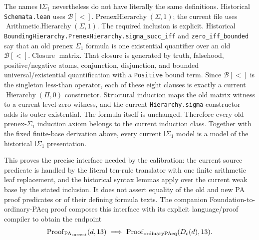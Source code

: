 The names $\mathsf I\Sigma _1$ nevertheless do not have literally
the same definitions.  Historical \texttt{Schemata.lean} uses
$\mathcal B[<].\operatorname{PrenexHierarchy}(\Sigma,1)$;
the current file uses
$\operatorname{Arithmetic.Hierarchy}(\Sigma,1)$.
The required inclusion is explicit.  Historical
\texttt{BoundingHierarchy.PrenexHierarchy.sigma\_succ\_iff}
and \texttt{zero\_iff\_bounded} say that an old prenex
$\Sigma_1$ formula is one existential quantifier over an old
$\mathcal B[<].\operatorname{Closure}$ matrix.  That closure is
generated by truth, falsehood, positive/negative atoms,
conjunction, disjunction, and bounded universal/existential
quantification with a \texttt{Positive} bound term.
Since $\mathcal B[<]$ is the singleton less-than operator, each of
these eight clauses is exactly a current
$\operatorname{Hierarchy}(\Pi,0)$ constructor.  Structural
induction maps the old matrix witness to a current level-zero
witness, and the current \texttt{Hierarchy.sigma} constructor
adds its outer existential.  The formula itself is unchanged.
Therefore every old prenex-$\Sigma_1$ induction axiom belongs to
the current induction class.  Together with the fixed finite-base
derivation above, every current $\mathsf I\Sigma _1$ model is a
model of the historical $\mathsf I\Sigma _1$ presentation.

This proves the precise interface needed by the calibration:
the current source predicate is handled by the literal ten-rule
translator with one finite arithmetic leaf replacement, and the
historical syntax lemmas apply over the current weak base by the
stated inclusion.  It does not assert equality of the old and new
PA proof predicates or of their defining formula texts.  The
companion Foundation-to-ordinary-PAeq proof composes this interface
with its explicit language/proof compiler to obtain the endpoint
\[
 \operatorname{Proof}_{\mathrm{PA}_{\rm current}}(d,13)
 \ \Longrightarrow\
 \operatorname{Proof}_{\mathrm{ordinaryPAeq}}(D_c(d),13).
\]
